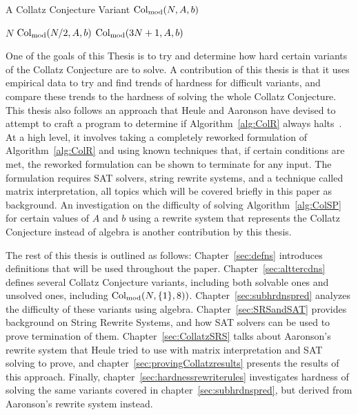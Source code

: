\begin{algorithm} 
\caption{A Collatz Conjecture Variant $\mathrm{Col}_{\text{mod}}(N,A,b)$}
\label{alg:ColSP} 
\begin{algorithmic}[1]
     \Return $N$
    \EndIf
     \Return $\mathrm{Col}_{\text{mod}}(N/2,A,b)$
    \EndIf
    \State \Return $\mathrm{Col}_{\text{mod}}(3N+1,A,b)$ 
\end{algorithmic}
\end{algorithm}
One of the goals of this Thesis is to try and determine how hard certain variants of the Collatz Conjecture are to solve. A contribution of this thesis is that it uses empirical data to try and find trends of hardness for difficult variants, and compare these trends to the hardness of solving the whole Collatz Conjecture. This thesis also follows an approach that Heule and Aaronson have devised to attempt to craft a program to determine if Algorithm~\ref{alg:ColR} always halts~\cite{HeuleAaronson}. At a high level, it involves taking a completely reworked formulation of Algorithm~\ref{alg:ColR} and using known techniques that, if certain conditions are met, the reworked formulation can be shown to terminate for any input. The formulation requires SAT solvers, string rewrite systems, and a technique called matrix interpretation, all topics which will be covered briefly in this paper as background. An investigation on the difficulty of solving Algorithm~\ref{alg:ColSP} for certain values of $A$ and $b$ using a rewrite system that represents the Collatz Conjecture instead of algebra is another contribution by this thesis.\par
The rest of this thesis is outlined as follows: Chapter~\ref{sec:defns} introduces definitions that will be used throughout the paper. Chapter~\ref{sec:alttercdns} defines several Collatz Conjecture variants, including both solvable ones and unsolved ones, including $\mathrm{Col}_{\text{mod}}(N,\{1\},8))$. Chapter~\ref{sec:subhrdnspred} analyzes the difficulty of these variants using algebra. Chapter~\ref{sec:SRSandSAT} provides background on String Rewrite Systems, and how SAT solvers can be used to prove termination of them. Chapter~\ref{sec:CollatzSRS} talks about Aaronson's rewrite system that Heule tried to use with matrix interpretation and SAT solving to prove, and chapter~\ref{sec:provingCollatzresults} presents the results of this approach. Finally, chapter~\ref{sec:hardnessrewriterules} investigates hardness of solving the same variants covered in chapter~\ref{sec:subhrdnspred}, but derived from Aaronson's rewrite system instead.


